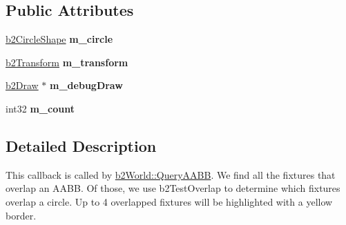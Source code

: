 \subsection*{Public Attributes}
\begin{DoxyCompactItemize}
\item 
\hypertarget{class_poly_shapes_callback_afb0a8870202844cc78bca6d2dab8ee42}{\hyperlink{classb2_circle_shape}{b2\-Circle\-Shape} {\bfseries m\-\_\-circle}}\label{class_poly_shapes_callback_afb0a8870202844cc78bca6d2dab8ee42}

\item 
\hypertarget{class_poly_shapes_callback_a889d46770b23be95591d195e8b2aac87}{\hyperlink{structb2_transform}{b2\-Transform} {\bfseries m\-\_\-transform}}\label{class_poly_shapes_callback_a889d46770b23be95591d195e8b2aac87}

\item 
\hypertarget{class_poly_shapes_callback_a962360c6b1bfd99b89939e37c9fa4634}{\hyperlink{classb2_draw}{b2\-Draw} $\ast$ {\bfseries m\-\_\-debug\-Draw}}\label{class_poly_shapes_callback_a962360c6b1bfd99b89939e37c9fa4634}

\item 
\hypertarget{class_poly_shapes_callback_af7451de2608c7dc246779570e0162531}{int32 {\bfseries m\-\_\-count}}\label{class_poly_shapes_callback_af7451de2608c7dc246779570e0162531}

\end{DoxyCompactItemize}


\subsection{Detailed Description}
This callback is called by \hyperlink{classb2_world_a711e55d2c6e68400f93472f807c3775b}{b2\-World\-::\-Query\-A\-A\-B\-B}. We find all the fixtures that overlap an A\-A\-B\-B. Of those, we use b2\-Test\-Overlap to determine which fixtures overlap a circle. Up to 4 overlapped fixtures will be highlighted with a yellow border. 

